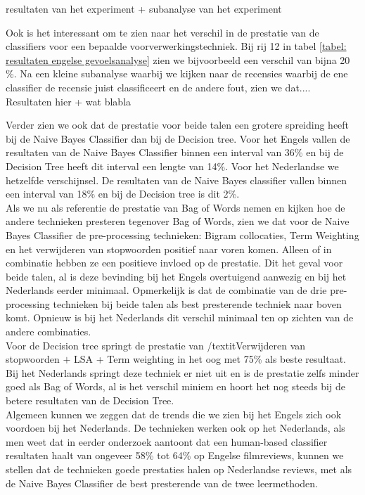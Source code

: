resultaten van het experiment + subanalyse van het experiment 

Ook is het interessant om te zien naar het verschil in de prestatie van de classifiers voor een bepaalde voorverwerkingstechniek. Bij rij 12 in tabel \ref{tabel: resultaten engelse gevoelsanalyse} zien we bijvoorbeeld een verschil van bijna 20 \%. Na een kleine subanalyse waarbij we kijken naar de recensies waarbij de ene classifier de recensie juist classificeert en de andere fout, zien we dat....\\

Resultaten hier + wat blabla

Verder zien we ook dat de prestatie voor beide talen een grotere spreiding heeft bij de Naive Bayes Classifier dan bij de Decision tree. Voor het Engels vallen de resultaten van de Naive Bayes Classifier binnen een interval van 36\% en bij de Decision Tree heeft dit interval een lengte van 14\%. Voor het Nederlandse we hetzelfde verschijnsel. De resultaten van de Naive Bayes classifier vallen binnen een interval van 18\% en bij de Decision tree is dit 2\%.\\

Als we nu als referentie de prestatie van Bag of Words nemen en kijken hoe de andere technieken presteren tegenover Bag of Words, zien we dat voor de Naive Bayes Classifier de pre-processing technieken: Bigram collocaties, Term Weighting en het verwijderen van stopwoorden positief naar voren komen. Alleen of in combinatie hebben ze een positieve invloed op de prestatie. Dit het geval voor beide talen, al is deze bevinding bij het Engels overtuigend aanwezig en bij het Nederlands eerder minimaal. Opmerkelijk is dat de combinatie van de drie pre-processing technieken bij beide talen als best presterende techniek naar boven komt. Opnieuw is bij het Nederlands dit verschil minimaal ten op zichten van de andere combinaties.\\

Voor de Decision tree springt de prestatie van /textit{Verwijderen van stopwoorden $+$ LSA + Term weighting} in het oog met 75\% als beste resultaat. Bij het Nederlands springt deze techniek er niet uit en is de prestatie zelfs minder goed als Bag of Words, al is het verschil miniem en hoort het nog steeds bij de betere resultaten van de Decision Tree.\\

Algemeen kunnen we zeggen dat de trends die we zien bij het Engels zich ook voordoen bij het Nederlands. De technieken werken ook op het Nederlands, als men weet dat in eerder onderzoek \cite{pang2002thumbs} aantoont dat een human-based classifier resultaten haalt van ongeveer 58\% tot 64\% op Engelse filmreviews, kunnen we stellen dat de technieken goede prestaties halen op Nederlandse reviews, met als de Naive Bayes Classifier de best presterende van de twee leermethoden.


